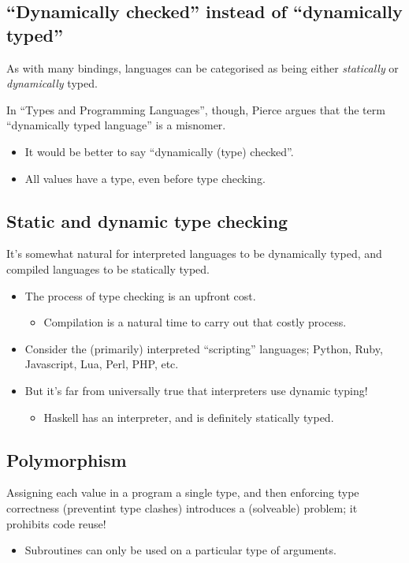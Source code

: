 \documentclass[11pt]{article}
\theoremstyle{definition}
\begin{document}
\subsection{“Dynamically checked” instead of “dynamically typed”}
\label{sec:org6862d95}

As with many bindings, languages can be categorised as
being either \emph{statically} or \emph{dynamically} typed.

In “Types and Programming Languages”, though, Pierce argues
that the term “dynamically typed language” is a misnomer.
\begin{itemize}
\item It would be better to say “dynamically (type) checked”.
\item All values have a type, even before type checking.
\end{itemize}

\subsection{Static and dynamic type checking}
\label{sec:orgfbbfbd8}

It's somewhat natural for interpreted languages to be dynamically typed,
and compiled languages to be statically typed.
\begin{itemize}
\item The process of type checking is an upfront cost.
\begin{itemize}
\item Compilation is a natural time to carry out that costly process.
\end{itemize}
\item Consider the (primarily) interpreted “scripting” languages;
Python, Ruby, Javascript, Lua, Perl, PHP, etc.
\item But it's far from universally true that interpreters use
dynamic typing!
\begin{itemize}
\item Haskell has an interpreter, and is definitely
statically typed.
\end{itemize}
\end{itemize}

\subsection{Polymorphism}
\label{sec:orgbc0d2c0}

Assigning each value in a program a single type, and then
enforcing type correctness (preventint type clashes)
introduces a (solveable) problem; it prohibits code reuse!
\begin{itemize}
\item Subroutines can only be used on a particular type of arguments.
\end{itemize}
\end{document}

